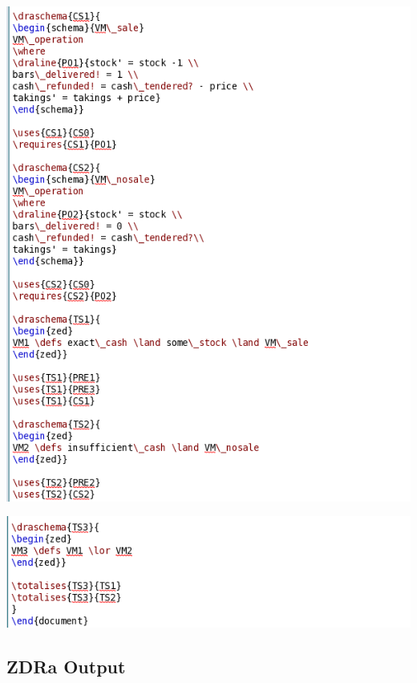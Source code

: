\noindent \includegraphics[scale=0.5]{examples/vm/2imageb.png}

\noindent \includegraphics[scale=0.5]{examples/vm/2imagec.png}
%
\subsection{ZDRa Output}
\label{app:vm2o}

